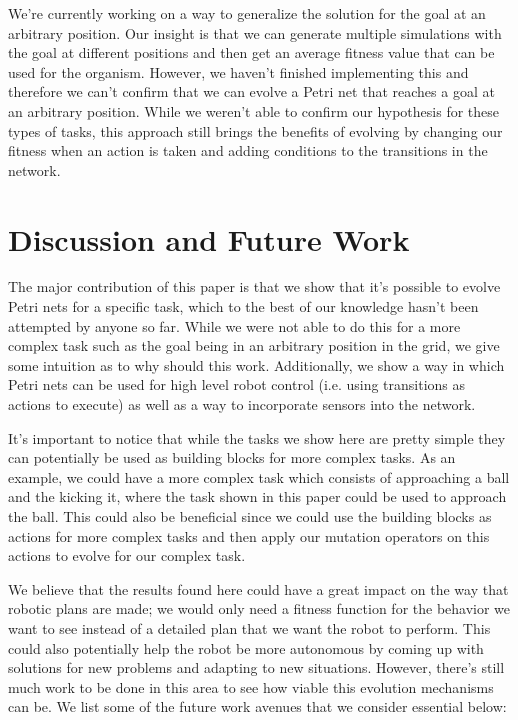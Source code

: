 \documentclass[12pt,a4paper,twocolumn]{article}
\begin{document}
We're currently working on a way to generalize the solution for the goal at an arbitrary position. Our insight is that we can generate multiple simulations with the goal at different positions and then get an average fitness value that can be used for the organism. However, we haven't finished implementing this and therefore we can't confirm that we can evolve a Petri net that reaches a goal at an arbitrary position. While we weren't able to confirm our hypothesis for these types of tasks, this approach still brings the benefits of evolving by changing our fitness when an action is taken and adding conditions to the transitions in the network. 




\section{Discussion and Future Work}
The major contribution of this paper is that we show that it's possible to evolve Petri nets for a specific task, which to the best of our knowledge hasn't been attempted by anyone so far. While we were not able to do this for a more complex task such as the goal being in an arbitrary position in the grid, we give some intuition as to why should this work. Additionally, we show a way in which Petri nets can be used for high level robot control (i.e. using transitions as actions to execute) as well as a way to incorporate sensors into the network. 

It's important to notice that while the tasks we show here are pretty simple they can potentially be used as building blocks for more complex tasks. As an example, we could have a more complex task which consists of approaching a ball and the kicking it, where the task shown in this paper could be used to approach the ball. This could also be beneficial since we could use the building blocks as actions for more complex tasks and then apply our mutation operators on this actions to evolve for our complex task. 

We believe that the results found here could have a great impact on the way that robotic plans are made; we would only need a fitness function for the behavior we want to see instead of a detailed plan that we want the robot to perform.  This could also potentially help the robot be more autonomous by coming up with solutions for new problems and adapting to new situations. However, there's still much work to be done in this area to see how viable this evolution mechanisms can be. We list some of the future work avenues that we consider essential below:
\end{document}
